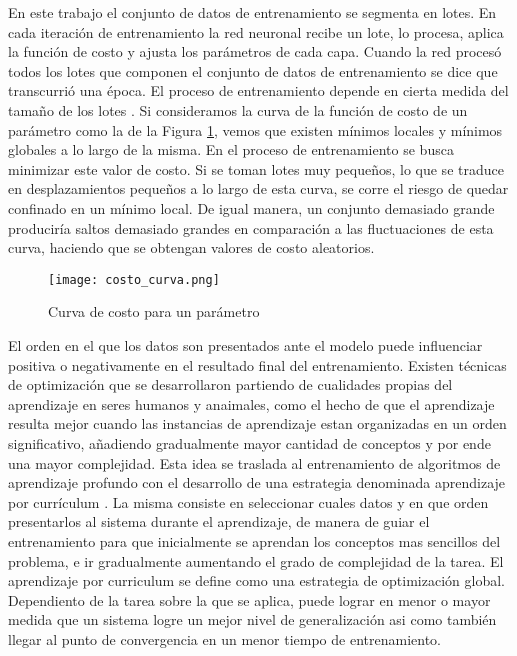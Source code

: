 En este trabajo el conjunto de datos de entrenamiento se segmenta en lotes. En cada iteración de entrenamiento la red neuronal recibe un lote, lo procesa, aplica la función de costo y ajusta los parámetros de cada capa. Cuando la red procesó todos los lotes que componen el conjunto de datos de entrenamiento se dice que transcurrió una época. El proceso de entrenamiento depende en cierta medida del tamaño de los lotes \cite{franchute}. Si consideramos la curva de la función de costo de un parámetro como la de la Figura \ref{fig:costo_curva}, vemos que existen mínimos locales y mínimos globales a lo largo de la misma. En el proceso de entrenamiento se busca minimizar este valor de costo. Si se toman lotes muy pequeños, lo que se traduce en desplazamientos pequeños a lo largo de esta curva, se corre el riesgo de quedar confinado en un mínimo local. De igual manera, un conjunto demasiado grande produciría saltos demasiado grandes en comparación a las fluctuaciones de esta curva, haciendo que se obtengan valores de costo aleatorios. 

\begin{figure}[H]
  \centering{}
  \texttt{[image: costo\_curva.png]}
  \caption{Curva de costo para un parámetro}
  \label{fig:costo_curva}
\end{figure}

El orden en el que los datos son presentados ante el modelo puede influenciar positiva o negativamente en el resultado final del entrenamiento. Existen técnicas de optimización que se desarrollaron partiendo de cualidades propias del aprendizaje en seres humanos y anaimales, como el hecho de que el aprendizaje resulta mejor cuando las instancias de aprendizaje estan organizadas en un orden significativo, añadiendo gradualmente mayor cantidad de conceptos y por ende una mayor complejidad. Esta idea se traslada al entrenamiento de algoritmos de aprendizaje profundo con el desarrollo de una estrategia denominada aprendizaje por currículum \cite{cv}. La misma consiste en seleccionar cuales datos y en que orden presentarlos al sistema durante el aprendizaje, de manera de guiar el entrenamiento para que inicialmente se aprendan los conceptos mas sencillos del problema, e ir gradualmente aumentando el grado de complejidad de la tarea. El aprendizaje por curriculum se define como una estrategia de optimización global. Dependiento de la tarea sobre la que se aplica, puede lograr en menor o mayor medida que un sistema logre un mejor nivel de generalización asi como también llegar al punto de convergencia en un menor tiempo de entrenamiento.


